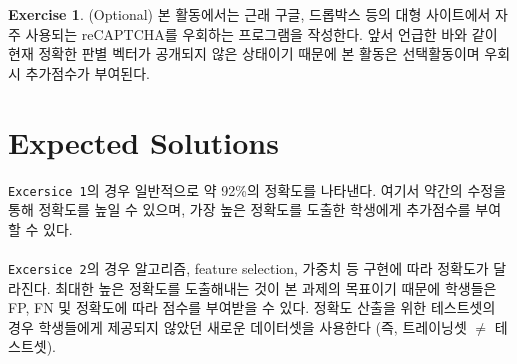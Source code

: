 \documentclass[a4paper, 11pt]{article}
\theoremstyle{definition}
\newtheorem{exercise}{Exercise}
\begin{document}
\begin{exercise} (Optional)
본 활동에서는 근래 구글, 드롭박스 등의 대형 사이트에서 자주 사용되는 reCAPTCHA를 우회하는 프로그램을 작성한다. 앞서 언급한 바와 같이 현재 정확한 판별 벡터가 공개되지 않은 상태이기 때문에 본 활동은 선택활동이며 우회시 추가점수가 부여된다.
\end{exercise}

\section{Expected Solutions}
\texttt{Excersice 1}의 경우 일반적으로 약 92\%의 정확도를 나타낸다. 여기서 약간의 수정을 통해 정확도를 높일 수 있으며, 
가장 높은 정확도를 도출한 학생에게 추가점수를 부여할 수 있다. \\\\
\texttt{Excersice 2}의 경우 알고리즘, feature selection, 가중치 등 구현에 따라 정확도가 달라진다. 
최대한 높은 정확도를 도출해내는 것이 본 과제의 목표이기 때문에 학생들은 FP, FN 및 정확도에 따라 점수를 부여받을 수 있다.
정확도 산출을 위한 테스트셋의 경우 학생들에게 제공되지 않았던 새로운 데이터셋을 사용한다 (즉, 트레이닝셋 $\neq$ 테스트셋).



\end{document}

